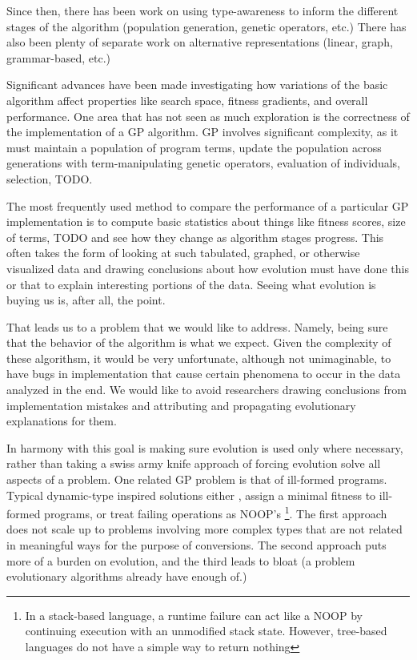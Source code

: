 \documentclass{acm_proc_article-sp}
\begin{document}
Since then, there has been work on using type-awareness to inform the
different stages of the algorithm
\cite{montana:strongtree, tchernev:crossmethods}  
(population generation, genetic operators, etc.) There has also been
plenty of separate work on alternative representations (linear, graph,
grammar-based, etc.) 

Significant advances have been made investigating how variations of
the basic algorithm affect properties like search space, fitness
gradients, and overall performance. One area that has not seen as much
exploration is the correctness of the implementation of a GP
algorithm. GP involves significant complexity, as it must maintain a
population of program terms, update the population across generations
with term-manipulating genetic operators, evaluation of individuals,
selection, TODO.

The most frequently used method to compare the performance of a
particular GP implementation is to compute basic statistics about
things like fitness scores, size of terms, TODO and see how they
change as algorithm stages progress. This often takes the form of
looking at such tabulated, graphed, or otherwise visualized data and
drawing conclusions about how evolution must have done this or that to
explain interesting portions of the data. Seeing what evolution is
buying us is, after all, the point.

That leads us to a problem that we would like to address. Namely,
being sure that the behavior of the algorithm is what we expect. Given
the complexity of these algorithsm, it would be very unfortunate,
although not unimaginable, to have bugs in implementation that cause
certain phenomena to occur in the data analyzed in the end. We would
like to avoid researchers drawing conclusions from implementation
mistakes and attributing and propagating evolutionary explanations for
them.

In harmony with this goal is making sure evolution is used only where
necessary, rather than taking a swiss army knife approach of forcing
evolution solve all aspects of a problem. One
related GP problem is that of ill-formed programs. Typical
dynamic-type inspired solutions either \cite{koza:92}, assign a minimal fitness to
ill-formed programs, or treat failing operations as
NOOP's
\footnote{In a stack-based language, a runtime failure can act like a
  NOOP by continuing execution with an unmodified stack state. However,
  tree-based languages do not have a simple way to return nothing}.
The first approach does not scale up to problems involving more
complex types that are not related in meaningful ways for the purpose
of conversions. The second approach puts more of a burden on evolution, and the third
leads to bloat (a problem evolutionary algorithms already have enough
of.)
\end{document}
